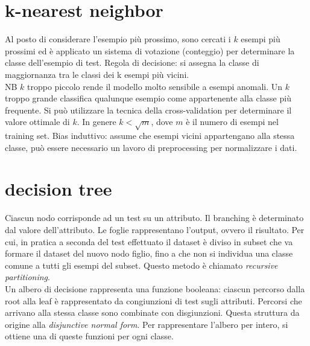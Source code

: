 \documentclass{article}
\begin{document}
\section{k-nearest neighbor}
Al posto di considerare l'esempio più prossimo, sono cercati i $k$ esempi più
prossimi ed è applicato un sistema di votazione (conteggio) per determinare la
classe dell'esempio di test. Regola di decisione: si assegna la classe di
maggiornanza tra le classi dei k esempi più vicini. \\
NB $k$ troppo piccolo rende il modello molto sensibile a esempi anomali.
Un $k$ troppo grande classifica qualunque esempio come appartenente alla classe
più frequente.
Si può utilizzare la tecnica della cross-validation per determinare il valore
ottimale di $k$.
In genere $k < \sqrt{m}$, dove $m$ è il numero di esempi nel training set.
Bias induttivo: assume che esempi vicini appartengano alla stessa classe, può
essere necessario un lavoro di preprocessing per normalizzare i dati.

\section{decision tree}
Ciascun nodo corrisponde ad un test su un attributo. Il branching è determinato
dal valore dell'attributo. Le foglie rappresentano l'output, ovvero il
risultato. Per cui, in pratica a seconda del test effettuato il dataset è diviso
in subset che va formare il dataset del nuovo nodo figlio, fino a che non si
individua una classe comune a tutti gli esempi del subset. Questo metodo è
chiamato \textit{recursive partitioning}. \\
Un albero di decisione rappresenta una funzione booleana: ciascun percorso dalla
root alla leaf è rappresentato da congiunzioni di test sugli attributi. Percorsi
che arrivano alla stessa classe sono combinate con disgiunzioni. Questa
struttura da origine alla \textit{disjunctive normal form}. Per rappresentare
l'albero per intero, si ottiene una di queste funzioni per ogni classe. \\
\end{document}
